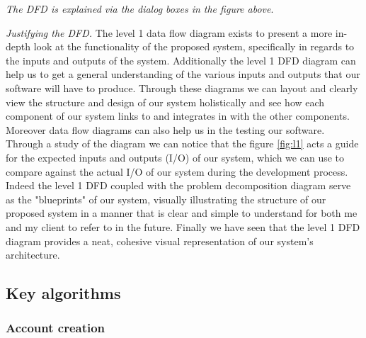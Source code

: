 \textit{The DFD is explained via the dialog boxes in 
the figure above}.\\ \vspace{0.2cm}

\textit{Justifying the DFD.} The level 1 data flow diagram 
exists to present a more in-depth look at the functionality of
the proposed system, specifically in regards to the inputs and 
outputs of the system. Additionally the level 1 DFD diagram can help 
us to get a general understanding of the various inputs and 
outputs that our software will have to produce. Through these
diagrams we can layout and clearly view the structure and
design of our system holistically and see how each component
of our system links to and integrates in with the other components.
Moreover data flow diagrams can also help us in the testing our 
software. Through a study of the diagram we can notice that the
figure \ref{fig:l1} acts a guide for the expected inputs and
outputs (I/O) of our system, which we can use to compare against
the actual I/O of our system during the development process.
Indeed the level 1 DFD coupled with the problem decomposition 
diagram serve as the "blueprints" of our system, visually 
illustrating the structure of our proposed system in a manner 
that is clear and simple to understand for both me and my client 
to refer to in the future.
Finally we have seen that the level 1 DFD diagram provides a
neat, cohesive visual representation of our system's architecture.

\subsection{Key algorithms}



\subsubsection{Account creation}

